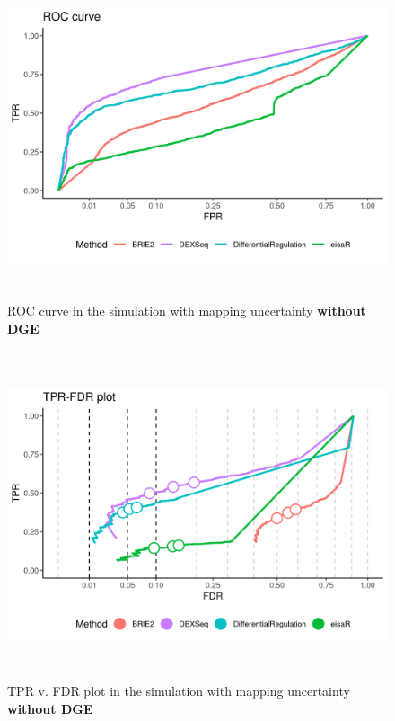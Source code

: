 \begin{figure}[!htb]
\begin{center}
\includegraphics[width=6in,height=3.8in]{../figures/simulation/minnow_simulation_ROC.png}
\end{center}
\caption{ROC curve in the simulation with mapping uncertainty \textbf{without DGE}}
\label{fig:soph_sim_ROC}
\end{figure}

\begin{figure}[!htb]
\begin{center}
\includegraphics[width=6in,height=3.8in]{../figures/simulation/minnow_simulation_FDR.png}
\end{center}
\caption{TPR v. FDR plot in the simulation with mapping uncertainty \textbf{without DGE}}
\label{fig:soph_sim_FDR}
\end{figure}

